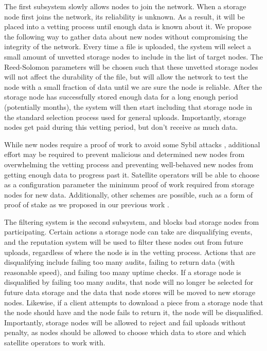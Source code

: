 \documentclass[11pt,fleqn,openany]{book}
\begin{document}
The first subsystem slowly allows nodes to join the network.
When a storage node first joins the network, its reliability is unknown.
As a result, it will be placed into a vetting
process until enough data is known about it.
We propose the following way to gather data about new nodes
without compromising the integrity of the network.
Every time a file is uploaded, the system will select a small amount of
unvetted storage nodes to include in the list of target nodes.
The Reed-Solomon parameters will be chosen such that these unvetted storage
nodes will not affect the durability of the file, but will allow the network
to test the node
with a small fraction of data until we are sure the node is reliable.
After the storage node has successfully stored enough data for a long enough
period (potentially months),
the system will then start including that storage
node in the standard selection process used for general uploads.
Importantly, storage nodes get paid during this
vetting period, but don't receive as much data.

While new nodes require a proof of work to avoid some Sybil attacks
\cite{sybil-attack}, additional effort may be required to prevent
malicious and determined new nodes from overwhelming the vetting process and
preventing well-behaved new nodes from getting enough data to progress past it.
Satellite operators will be able to choose as a configuration
parameter the minimum proof of work required from storage nodes for new data.
Additionally, other schemes are possible, such as a form of proof of stake as
we proposed in our previous work \cite{sybil-cost}.

The filtering system is the second subsystem, and blocks bad storage nodes from
participating.
Certain actions a storage node can take are disqualifying events, and the
reputation system will be used to filter these nodes out from future uploads,
regardless of where the node is in the vetting process.
Actions that are disqualifying include failing too many audits,
failing to return data (with reasonable speed), and failing too many uptime
checks.
If a storage node is disqualified by failing too many audits, that node will no
longer be selected for future data storage and the data that node stores will
be moved to new storage nodes.
Likewise, if a client attempts to download a piece from a storage node that
the node should have and the node fails to return it, the
node will be disqualified. Importantly, storage nodes will be allowed to reject
and fail uploads without penalty, as nodes should be allowed to choose which
data to store and which satellite operators to work with.
\end{document}
